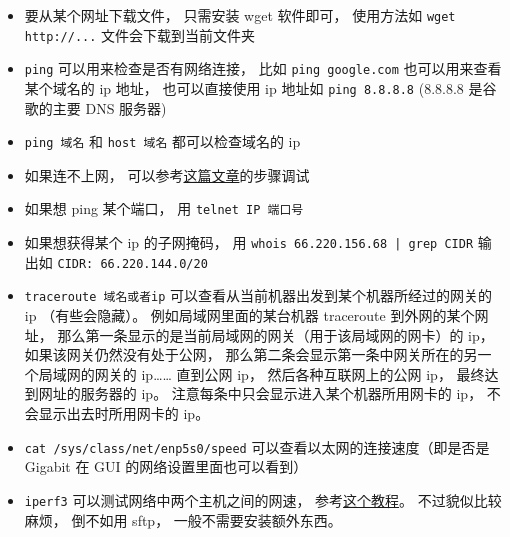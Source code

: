 \begin{itemize}
\item 要从某个网址下载文件， 只需安装 wget 软件即可， 使用方法如 \verb`wget http://...` 文件会下载到当前文件夹
\item \verb`ping` 可以用来检查是否有网络连接， 比如 \verb`ping google.com` 也可以用来查看某个域名的 ip 地址， 也可以直接使用 ip 地址如 \verb`ping 8.8.8.8` (8.8.8.8 是谷歌的主要 DNS 服务器)
\item \verb`ping 域名` 和 \verb|host 域名| 都可以检查域名的 ip
\item 如果连不上网， 可以参考\href{https://upcloud.com/community/tutorials/troubleshoot-network-connectivity-linux-server/}{这篇文章}的步骤调试
\item 如果想 ping 某个端口， 用 \verb|telnet IP 端口号|
\item 如果想获得某个 ip 的子网掩码， 用 \verb`whois 66.220.156.68 | grep CIDR` 输出如 \verb|CIDR: 66.220.144.0/20|
\item \verb|traceroute 域名或者ip| 可以查看从当前机器出发到某个机器所经过的网关的 ip （有些会隐藏）。 例如局域网里面的某台机器 traceroute 到外网的某个网址， 那么第一条显示的是当前局域网的网关（用于该局域网的网卡）的 ip， 如果该网关仍然没有处于公网， 那么第二条会显示第一条中网关所在的另一个局域网的网关的 ip…… 直到公网 ip， 然后各种互联网上的公网 ip， 最终达到网址的服务器的 ip。 注意每条中只会显示进入某个机器所用网卡的 ip， 不会显示出去时所用网卡的 ip。
\item \verb|cat /sys/class/net/enp5s0/speed| 可以查看以太网的连接速度（即是否是 Gigabit 在 GUI 的网络设置里面也可以看到）
\item \verb|iperf3| 可以测试网络中两个主机之间的网速， 参考\href{https://www.cyberciti.biz/faq/how-to-test-the-network-speedthroughput-between-two-linux-servers/}{这个教程}。 不过貌似比较麻烦， 倒不如用 sftp， 一般不需要安装额外东西。
\end{itemize}

